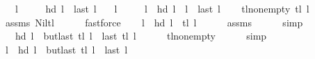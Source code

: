 \begin{isabellebody}
\ \ \ {\isachardoublequoteopen}l\ {\isasymnoteq}\ {\isacharbrackleft}{\kern0pt}{\isacharbrackright}{\kern0pt}{\isachardoublequoteclose}\isanewline
\ \ \ {\isachardoublequoteopen}hd\ l\ {\isasymnoteq}\ last\ l{\isachardoublequoteclose}\isanewline
\ \ \ l{\isacharprime}{\kern0pt}\ \isanewline
\ \ \ \ {\isachardoublequoteopen}l\ {\isacharequal}{\kern0pt}\ hd\ l\ {\isacharhash}{\kern0pt}\ l{\isacharprime}{\kern0pt}\ {\isacharat}{\kern0pt}\ {\isacharbrackleft}{\kern0pt}last\ l{\isacharbrackright}{\kern0pt}{\isachardoublequoteclose}%
\endisataginvisible
{\isafoldinvisible}%
%
\isadeliminvisible
\isanewline
%
\endisadeliminvisible
%
\isadelimproof
%
\endisadelimproof
%
\isatagproof
{}\isamarkupfalse%
\isanewline
\ \ \isamarkupfalse%
\ tl{\isacharunderscore}{\kern0pt}non{\isacharunderscore}{\kern0pt}empty{\isacharcolon}{\kern0pt}\ {\isachardoublequoteopen}tl\ l\ {\isasymnoteq}\ {\isacharbrackleft}{\kern0pt}{\isacharbrackright}{\kern0pt}{\isachardoublequoteclose}\isanewline
\ \ \ \ \isamarkupfalse%
\ assms\ Nil{\isacharunderscore}{\kern0pt}tl\isanewline
\ \ \ \ \isamarkupfalse%
\ fastforce\isanewline
\ \ \isamarkupfalse%
\ {\isachardoublequoteopen}l\ {\isacharequal}{\kern0pt}\ hd\ l\ {\isacharhash}{\kern0pt}\ tl\ l{\isachardoublequoteclose}\isanewline
\ \ \ \ \isamarkupfalse%
\ assms{\isacharparenleft}{\kern0pt}{}{\isacharparenright}{\kern0pt}\isanewline
\ \ \ \ \isamarkupfalse%
\ simp\isanewline
\ \ \isamarkupfalse%
\ \isamarkupfalse%
\ {\isachardoublequoteopen}{\isachardot}{\kern0pt}{\isachardot}{\kern0pt}{\isachardot}{\kern0pt}\ {\isacharequal}{\kern0pt}\ hd\ l\ {\isacharhash}{\kern0pt}\ {\isacharparenleft}{\kern0pt}butlast\ {\isacharparenleft}{\kern0pt}tl\ l{\isacharparenright}{\kern0pt}\ {\isacharat}{\kern0pt}\ {\isacharbrackleft}{\kern0pt}last\ {\isacharparenleft}{\kern0pt}tl\ l{\isacharparenright}{\kern0pt}{\isacharbrackright}{\kern0pt}{\isacharparenright}{\kern0pt}{\isachardoublequoteclose}\isanewline
\ \ \ \ \isamarkupfalse%
\ tl{\isacharunderscore}{\kern0pt}non{\isacharunderscore}{\kern0pt}empty\isanewline
\ \ \ \ \isamarkupfalse%
\ simp\isanewline
\ \ \isamarkupfalse%
\ \isamarkupfalse%
\ {\isachardoublequoteopen}l\ {\isacharequal}{\kern0pt}\ hd\ l\ {\isacharhash}{\kern0pt}\ {\isacharparenleft}{\kern0pt}butlast\ {\isacharparenleft}{\kern0pt}tl\ l{\isacharparenright}{\kern0pt}\ {\isacharat}{\kern0pt}\ {\isacharbrackleft}{\kern0pt}last\ l{\isacharbrackright}{\kern0pt}{\isacharparenright}{\kern0pt}{\isachardoublequoteclose}\isanewline

\end{isabellebody}
